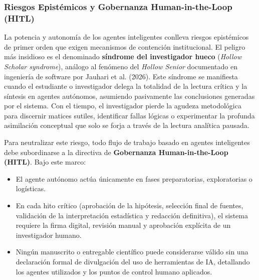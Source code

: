 \subsubsection{Riesgos Epistémicos y Gobernanza Human-in-the-Loop (HITL)}

La potencia y autonomía de los agentes inteligentes conlleva riesgos epistémicos de primer orden que exigen mecanismos de contención institucional. El peligro más insidioso es el denominado \textbf{síndrome del investigador hueco} (\textit{Hollow Scholar syndrome}), análogo al fenómeno del \textit{Hollow Senior} documentado en ingeniería de software por Jauhari et al. (2026). Este síndrome se manifiesta cuando el estudiante o investigador delega la totalidad de la lectura crítica y la síntesis en agentes autónomos, asumiendo pasivamente las conclusiones generadas por el sistema. Con el tiempo, el investigador pierde la agudeza metodológica para discernir matices sutiles, identificar fallas lógicas o experimentar la profunda asimilación conceptual que solo se forja a través de la lectura analítica pausada.

Para neutralizar este riesgo, todo flujo de trabajo basado en agentes inteligentes debe subordinarse a la directiva de \textbf{Gobernanza Human-in-the-Loop (HITL)}. Bajo este marco:
\begin{itemize}
    \item El agente autónomo actúa únicamente en fases preparatorias, exploratorias o logísticas.
    \item En cada hito crítico (aprobación de la hipótesis, selección final de fuentes, validación de la interpretación estadística y redacción definitiva), el sistema requiere la firma digital, revisión manual y aprobación explícita de un investigador humano.
    \item Ningún manuscrito o entregable científico puede considerarse válido sin una declaración formal de divulgación del uso de herramientas de IA, detallando los agentes utilizados y los puntos de control humano aplicados.
\end{itemize}

